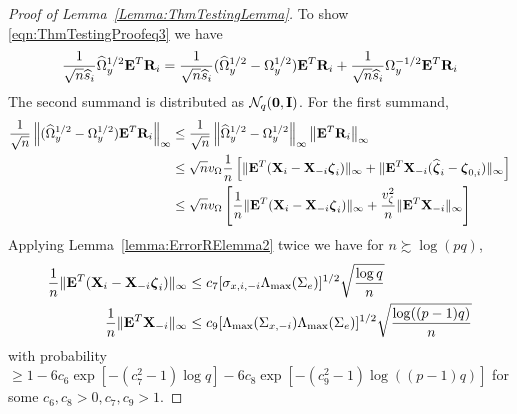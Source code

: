 \documentclass[12pt, letterpaper]{article}
\numberwithin{equation}{section}
\begin{document}
\begin{proof}[Proof of Lemma~\ref{Lemma:ThmTestingLemma}]
To show \eqref{eqn:ThmTestingProofeq3} we have
%
\begin{align*}
\frac{1}{\sqrt n \widehat s_i}  \widehat \Omega_y^{1/2} {\mathbf{E}}^T {\mathbf{R}}_i =
\frac{1}{\sqrt n \widehat s_i}  (\widehat \Omega_y^{1/2} - \Omega_y^{1/2}) {\mathbf{E}}^T {\mathbf{R}}_i +
\frac{1}{\sqrt n \widehat s_i}  \Omega_y^{-1/2} {\mathbf{E}}^T {\mathbf{R}}_i
\end{align*}
%
The second summand is distributed as ${\cal{N}}_q ({\bf 0}, {\mathbf{I}})$. For the first summand,
%
\begin{align}\label{eqn:ThmTestingProofeq31}
\frac{1}{\sqrt n}  \left\| (\widehat \Omega_y^{1/2} - \Omega_y^{1/2}) {\mathbf{E}}^T {\mathbf{R}}_i \right\|_\infty & \leq
\frac{1}{\sqrt n}  \left\| \widehat \Omega_y^{1/2} - \Omega_y^{1/2} \right\|_\infty  \left\| {\mathbf{E}}^T {\mathbf{R}}_i \right\|_\infty  \notag\\
& \leq \sqrt n v_\Omega \frac{1}{n} \left[ \| {\mathbf{E}}^T ({\mathbf{X}}_i -  {\mathbf{X}}_{-i} {\boldsymbol{\zeta}}_i ) \|_\infty + \| {\mathbf{E}}^T {\mathbf{X}}_{-i} (\widehat {{\boldsymbol{\zeta}}}_i - {\boldsymbol{\zeta}}_{0,i} ) \|_\infty \right] \notag\\
& \leq \sqrt n v_\Omega \left[ \frac{1}{n} \| {\mathbf{E}}^T ({\mathbf{X}}_i -  {\mathbf{X}}_{-i} {\boldsymbol{\zeta}}_i ) \|_\infty + 
\frac{v_\zeta^2}{n} \| {\mathbf{E}}^T {\mathbf{X}}_{-i} \|_\infty \right]
\end{align}
%
Applying Lemma~\ref{lemma:ErrorRElemma2} twice we have for $n \succsim \log(pq)$,
%
\begin{align}
\frac{1}{n} \| {\mathbf{E}}^T ({\mathbf{X}}_i -  {\mathbf{X}}_{-i} {\boldsymbol{\zeta}}_i ) \|_\infty & \leq 
c_7 [ \sigma_{x,i,-i} \Lambda_{\max} (\Sigma_e) ]^{1/2} \sqrt{\frac{ \log q}{n}}\label{eqn:ThmTestingProofeq32}\\
\frac{1}{n} \| {\mathbf{E}}^T {\mathbf{X}}_{-i} \|_\infty  & \leq 
c_9 [ \Lambda_{\max} (\Sigma_{x,-i}) \Lambda_{\max} (\Sigma_e) ]^{1/2} \sqrt{\frac{ \log((p-1)q)}{n}}\label{eqn:ThmTestingProofeq33}
\end{align}
%
with probability $\geq 1 - 6c_6 \exp [-(c_7^2-1) \log q] - 6c_8 \exp [-(c_9^2-1) \log((p-1)q)]$ for some $c_6, c_8 >0, c_7, c_9 > 1$.


\end{proof}
\end{document}
